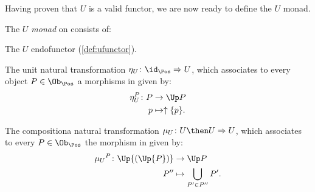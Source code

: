 Having proven that $U$ is a valid functor, we are now ready to define the $U$ monad.
\begin{definition}[$U$ monad]
    The \emph{$U$ monad} on \Pos consists of:
    \begin{compactenum}
        \item The $U$ endofunctor (\cref{def:ufunctor}).
        \item The unit natural transformation $\eta_U \colon \id_{\Pos}\Rightarrow U$, which associates to every object $P\in \Ob_\Pos$ a morphisms in \Pos given by:
        \begin{equation}
            \begin{aligned}
                \eta_{U}^P\colon P &\to \Up P\\
                p&\mapsto \uparrow \{p\}.
            \end{aligned}
        \end{equation}
        \item The compositiona natural transformation $\mu_U\colon U\then U\Rightarrow U$, which associates to every $P\in \Ob_\Pos$ the morphism in \Pos given by:
        \begin{equation}
            \begin{aligned}
                \mu{_U}^P\colon \Up{(\Up{P})}&\to \Up P\\
                P''&\mapsto \bigcup_{P'\in P''}P'.
            \end{aligned}
        \end{equation}
    \end{compactenum}
\end{definition}

